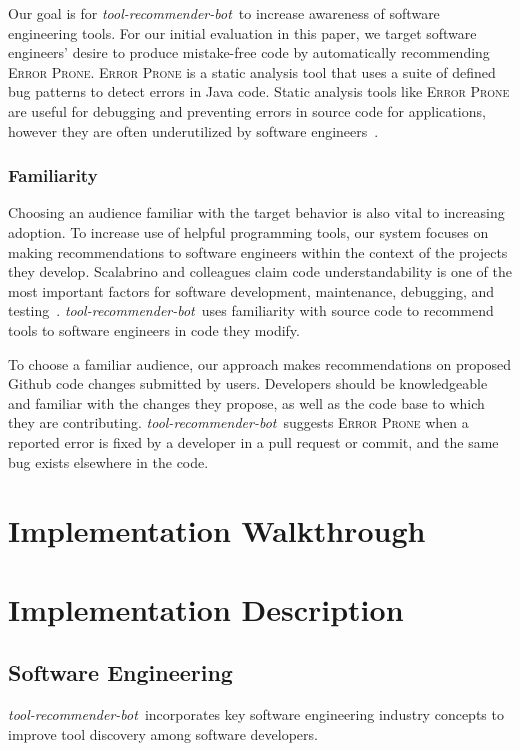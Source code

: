 \documentclass[sigconf,review,anonymous]{acmart}
\newcommand{\tool}{\textsl{tool-recommender-bot}}
\begin{document}
Our goal is for \tool~to increase awareness of software engineering tools. For our initial evaluation in this paper, we target software engineers' desire to produce mistake-free code by automatically recommending \textsc{Error Prone}. \textsc{Error Prone} is a static analysis tool that uses a suite of defined bug patterns to detect errors in Java code. Static analysis tools like \textsc{Error Prone} are useful for debugging and preventing errors in source code for applications, however they are often underutilized by software engineers~\cite{Johnson2013Why}. 

\subsubsection{Familiarity}

Choosing an audience familiar with the target behavior is also vital to increasing adoption. To increase use of helpful programming tools, our system focuses on making recommendations to software engineers within the context of the projects they develop. Scalabrino and colleagues claim code understandability is one of the most important factors for software development, maintenance, debugging, and testing~\cite{Scalabrino2017Understandability}. \tool~uses familiarity with source code to recommend tools to software engineers in code they modify.

To choose a familiar audience, our approach makes recommendations on proposed Github code changes submitted by users. Developers should be knowledgeable and familiar with the changes they propose, as well as the code base to which they are contributing. \tool~suggests \textsc{Error Prone} when a reported error is fixed by a developer in a pull request or commit, and the same bug exists elsewhere in the code. 


\section{Implementation Walkthrough}

\section{Implementation Description}

\subsection{Software Engineering}

\tool~incorporates key software engineering industry concepts to improve tool discovery among software developers.
\end{document}
